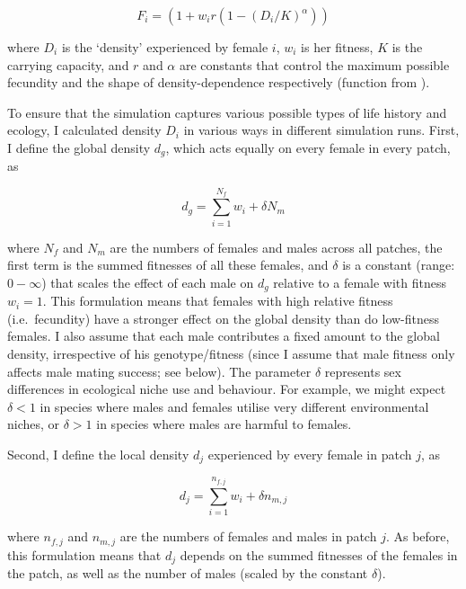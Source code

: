 \documentclass[]{rsos}%
\begin{document}
\begin{equation}
\tag{1}
F_i = (1 + w_i r(1 - (D_i / K) ^ \alpha))
\end{equation}

where \(D_i\) is the `density' experienced by female \(i\), \(w_i\) is
her fitness, \(K\) is the carrying capacity, and \(r\) and \(\alpha\)
are constants that control the maximum possible fecundity and the shape
of density-dependence respectively (function from \citep{fowler1981de}).

To ensure that the simulation captures various possible types of life
history and ecology, I calculated density \(D_i\) in various ways in
different simulation runs. First, I define the global density \(d_g\),
which acts equally on every female in every patch, as

\begin{equation}
\tag{2}
d_g = \sum_{i=1}^{N_f} w_i + \delta N_m
\end{equation}

where \(N_f\) and \(N_m\) are the numbers of females and males across
all patches, the first term is the summed fitnesses of all these
females, and \(\delta\) is a constant (range: \(0-\infty\)) that scales
the effect of each male on \(d_g\) relative to a female with fitness
\(w_i = 1\). This formulation means that females with high relative
fitness (i.e.~fecundity) have a stronger effect on the global density
than do low-fitness females. I also assume that each male contributes a
fixed amount to the global density, irrespective of his genotype/fitness
(since I assume that male fitness only affects male mating success; see
below). The parameter \(\delta\) represents sex differences in
ecological niche use and behaviour. For example, we might expect
\(\delta<1\) in species where males and females utilise very different
environmental niches, or \(\delta>1\) in species where males are harmful
to females.

Second, I define the local density \(d_j\) experienced by every female
in patch \(j\), as

\begin{equation}
\tag{3}
d_j = \sum_{i=1}^{n_{f,j}} w_i + \delta n_{m,j}
\end{equation}

where \(n_{f,j}\) and \(n_{m,j}\) are the numbers of females and males
in patch \(j\). As before, this formulation means that \(d_j\) depends
on the summed fitnesses of the females in the patch, as well as the
number of males (scaled by the constant \(\delta\)).
\end{document}
